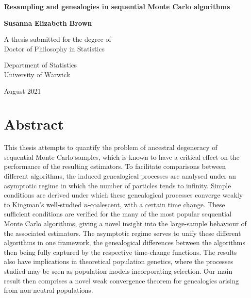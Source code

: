 \documentclass[oneside]{scrbook} %
\theoremstyle{definition}
\newcommand{\1}[1]{\mathbbm{1}_{#1}} %
\begin{document}
\begin{titlepage}
\centering
\vspace*{5cm}
\begin{LARGE}\bfseries
Resampling and genealogies in sequential Monte Carlo algorithms\par \end{LARGE} 
\vspace{1.5cm} 
\begin{Large}\bfseries
Susanna Elizabeth Brown\par
\end{Large}
\vspace{3cm}
\begin{large}
A thesis submitted for the degree of\\Doctor of Philosophy in Statistics \par
\vspace{1.5cm}
Department of Statistics\\ University of Warwick \par
\vspace{1.5cm}
August 2021 %
\end{large}
\end{titlepage}


\frontmatter


\chapter*{Abstract}
This thesis attempts to quantify the problem of ancestral degeneracy of sequential Monte Carlo samples, which is known to  have a critical effect on the performance of the resulting estimators.
To facilitate comparisons between different algorithms, the induced genealogical processes are analysed under an asymptotic regime in which the number of particles tends to infinity. 
Simple conditions are derived under which these genealogical processes converge weakly to Kingman's well-studied $n$-coalescent, with a certain time change.
These sufficient conditions are verified for the many of the most popular sequential Monte Carlo algorithms, giving a novel insight into the large-sample behaviour of the associated estimators.
The asymptotic regime serves to unify these different algorithms in one framework, the genealogical differences between the algorithms then being fully captured by the respective time-change functions.
The results also have implications in theoretical population genetics, where the processes studied may be seen as population models incorporating selection. Our main result then comprises a novel weak convergence theorem for genealogies arising from non-neutral populations.
\end{document}
